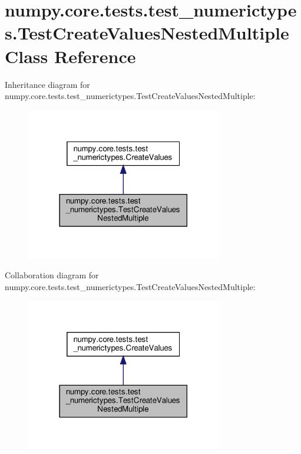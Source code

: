 \hypertarget{classnumpy_1_1core_1_1tests_1_1test__numerictypes_1_1TestCreateValuesNestedMultiple}{}\section{numpy.\+core.\+tests.\+test\+\_\+numerictypes.\+Test\+Create\+Values\+Nested\+Multiple Class Reference}
\label{classnumpy_1_1core_1_1tests_1_1test__numerictypes_1_1TestCreateValuesNestedMultiple}


Inheritance diagram for numpy.\+core.\+tests.\+test\+\_\+numerictypes.\+Test\+Create\+Values\+Nested\+Multiple\+:
\nopagebreak
\begin{figure}[H]
\begin{center}
\leavevmode
\includegraphics[width=242pt]{classnumpy_1_1core_1_1tests_1_1test__numerictypes_1_1TestCreateValuesNestedMultiple__inherit__graph}
\end{center}
\end{figure}


Collaboration diagram for numpy.\+core.\+tests.\+test\+\_\+numerictypes.\+Test\+Create\+Values\+Nested\+Multiple\+:
\nopagebreak
\begin{figure}[H]
\begin{center}
\leavevmode
\includegraphics[width=242pt]{classnumpy_1_1core_1_1tests_1_1test__numerictypes_1_1TestCreateValuesNestedMultiple__coll__graph}
\end{center}
\end{figure}
